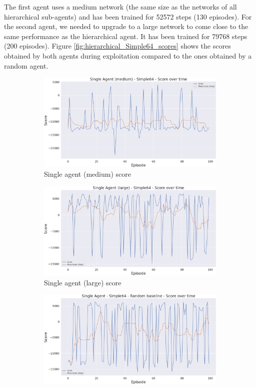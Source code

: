The first agent uses a medium network (the same size as the networks of all hierarchical sub-agents) and has been trained for 52572 steps (130 episodes). For the second agent, we needed to upgrade to a large network to come close to the same performance as the hierarchical agent. It has been trained for 79768 steps (200 episodes). Figure \ref{fig:hierarchical_Simple64_scores} shows the scores obtained by both agents during exploitation compared to the ones obtained by a random agent.

\begin{figure}[t]
    \centering
    \begin{subfigure}[b]{0.48\textwidth}
        \includegraphics[width=1\textwidth]{figs/single_dqn_m_130/exploit/score.png}
        \caption{Single agent (medium) score}
    \end{subfigure}
    \hfill
    \begin{subfigure}[b]{0.48\textwidth}
        \includegraphics[width=1\textwidth]{figs/single_dqn_l_200/exploit/score.png}
        \caption{Single agent (large) score}
    \end{subfigure}
    \hfill
    \begin{subfigure}[b]{0.48\textwidth}
        \includegraphics[width=1\textwidth]{figs/single_random/exploit/score.png}

\end{subfigure}
\end{figure}
